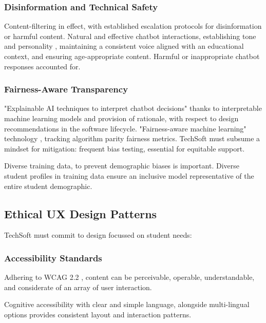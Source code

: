 \documentclass[14pt,a4paper]{article}
\begin{document}
\begin{multicols}{2}
\subsubsection{Disinformation and Technical Safety}
Content-filtering in effect, with established escalation protocols for disinformation or harmful content.
Natural and effective chatbot interactions, establishing tone and personality \textit{\parencite[pp. 20-50]{Bradbury2024}}, maintaining a consistent voice aligned with an educational context, and ensuring age-appropriate content.
Harmful or inappropriate chatbot responses \textit{\parencite[p. e11510]{Bickmore2021}} accounted for.

\subsubsection{Fairness-Aware Transparency}
 "Explainable AI techniques to interpret chatbot decisions" \textit{\parencite[pp. 82-115]{Arrieta2022}} thanks to interpretable machine learning models and provision of rationale, with respect to design recommendations in the software lifecycle.
"Fairness-aware machine learning" technology \textit{\parencite{Barocas2021}}, tracking algorithm parity fairness metrics.
    TechSoft must subsume a mindset for mitigation: frequent bias testing, essential for equitable support.

Diverse training data, to prevent demographic biases \textit{\parencite[pp. 1-35]{Mehrabi2024}} is important.
Diverse student profiles in training data ensure an inclusive model representative of the entire student demographic.


\subsection{Ethical UX Design Patterns}
TechSoft must commit to design focussed on student needs:

\subsubsection{Accessibility Standards}
Adhering to WCAG 2.2 \textit{\parencite{W3C2024}}, content can be perceivable, operable, understandable, and considerate of an array of user interaction.

Cognitive accessibility \textit{\parencite[pp. 1-10]{Yesilada2024}} with clear and simple language, alongside multi-lingual options \textit{\parencite[pp. 50-100]{AnastasiouSchaler2024}} provides consistent layout and interaction patterns.


\end{multicols}
\end{document}

